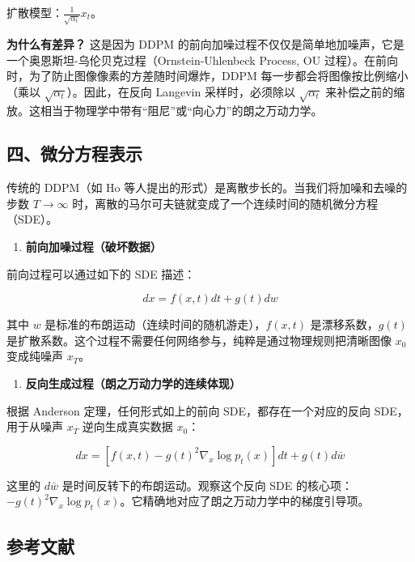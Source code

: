 扩散模型：\(\frac{1}{\sqrt{\alpha_t}}x_t\)。

\textbf{为什么有差异？} 这是因为 DDPM 的前向加噪过程不仅仅是简单地加噪声，它是一个奥恩斯坦-乌伦贝克过程（Ornstein-Uhlenbeck Process, OU 过程）。在前向时，为了防止图像像素的方差随时间爆炸，DDPM 每一步都会将图像按比例缩小（乘以 \(\sqrt{\alpha_t}\)）。因此，在反向 Langevin 采样时，必须除以 \(\sqrt{\alpha_t}\) 来补偿之前的缩放。这相当于物理学中带有``阻尼''或``向心力''的朗之万动力学。

\hypertarget{ux56dbux5faeux5206ux65b9ux7a0bux8868ux793a}{%
\subsection{四、微分方程表示}\label{ux56dbux5faeux5206ux65b9ux7a0bux8868ux793a}}

传统的 DDPM（如 Ho 等人提出的形式）是离散步长的。当我们将加噪和去噪的步数 \(T\to\infty\) 时，离散的马尔可夫链就变成了一个连续时间的随机微分方程（SDE）。

\begin{enumerate}
\def\labelenumi{\arabic{enumi}.}
\tightlist
\item
  \textbf{前向加噪过程（破坏数据）}
\end{enumerate}

前向过程可以通过如下的 SDE 描述：

\[
dx=f(x,t)dt+g(t)dw
\]

其中 \(w\) 是标准的布朗运动（连续时间的随机游走），\(f(x,t)\) 是漂移系数，\(g(t)\) 是扩散系数。这个过程不需要任何网络参与，纯粹是通过物理规则把清晰图像 \(x_0\) 变成纯噪声 \(x_T\)。

\begin{enumerate}
\def\labelenumi{\arabic{enumi}.}
\setcounter{enumi}{1}
\tightlist
\item
  \textbf{反向生成过程（朗之万动力学的连续体现）}
\end{enumerate}

根据 Anderson 定理，任何形式如上的前向 SDE，都存在一个对应的反向 SDE，用于从噪声 \(x_T\) 逆向生成真实数据 \(x_0\)：

\[
dx=\left[f(x,t)-g(t)^2\nabla_x\log p_t(x)\right]dt+g(t)d\bar{w}
\]

这里的 \(d\bar{w}\) 是时间反转下的布朗运动。观察这个反向 SDE 的核心项：\(-g(t)^2\nabla_x\log p_t(x)\)。它精确地对应了朗之万动力学中的梯度引导项。

\FloatBarrier
{}
\hypertarget{ux53c2ux8003ux6587ux732e-129}{%
\subsection{参考文献}\label{ux53c2ux8003ux6587ux732e-129}}

